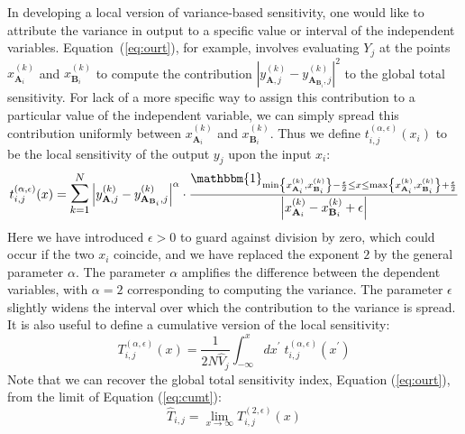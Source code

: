 \documentclass[12pt]{article}
\begin{document}
In developing a local version of variance-based sensitivity, one would like to attribute the variance in output to a specific value or interval of the independent variables. Equation~(\ref{eq:ourt}), for example, involves evaluating $Y_j$ at the points $x_{\mathbf{A}_i}^{(k)}$ and $x_{\mathbf{B}_i}^{(k)}$ to compute the contribution $\left| y_{\mathbf{A},j}^{(k)} - y_{\mathbf{A}_{\mathbf{B}_i},j}^{(k)} \right| ^2$ to the global total sensitivity. For lack of a more specific way to assign this contribution to a particular value of the independent variable, we can simply spread this contribution uniformly between $x_{\mathbf{A}_i}^{(k)}$ and $x_{\mathbf{B}_i}^{(k)}$. Thus we define $t_{i,j}^{(\alpha,\epsilon)}(x_i)$ to be the local sensitivity of the output $y_j$ upon the input $x_i$:
\begin{equation}
    t_{i,j}^{(\alpha,\epsilon)}(x) = \mathlarger{\mathlarger{\sum}}_{k=1}^N \left| y_{\mathbf{A},j}^{(k)} - y_{\mathbf{A}_{\mathbf{B}_i},j}^{(k)} \right| ^ \alpha  \cdot \frac{\mathbbm{1}_{\min \left\{ x_{\mathbf{A}_i}^{(k)} , x_{\mathbf{B}_i}^{(k)} \right\} - \frac{\epsilon}{2} \leq x \leq \max \left\{ x_{\mathbf{A}_i}^{(k)} , x_{\mathbf{B}_i}^{(k)} \right\} + \frac{\epsilon}{2}}}{\left| x_{\mathbf{A}_i}^{(k)} - x_{\mathbf{B}_i}^{(k)} + \epsilon \right|} \label{eq:tx}
\end{equation}
Here we have introduced $\epsilon > 0$ to guard against division by zero, which could occur if the two $x_i$ coincide, and we have replaced the exponent $2$ by the general parameter $\alpha$. The parameter $\alpha$ amplifies the difference between the dependent variables, with $\alpha = 2$ corresponding to computing the variance. The parameter $\epsilon$ slightly widens the interval over which the contribution to the variance is spread. It is also useful to define a cumulative version of the local sensitivity:
\begin{equation}
    T_{i,j}^{(\alpha,\epsilon)}(x) = \frac{1}{2 N \hat{V}_j} \int_{-\infty}^x d x^\prime \; t_{i,j}^{(\alpha,\epsilon)}(x^\prime) \label{eq:cumt}
\end{equation}
Note that we can recover the global total sensitivity index, Equation (\ref{eq:ourt}), from the limit of Equation (\ref{eq:cumt}):
\begin{equation*}
    \hat{T}_{i,j} = \lim_{x \rightarrow \infty} T_{i,j}^{(2,\epsilon)}(x)
\end{equation*}
\end{document}
